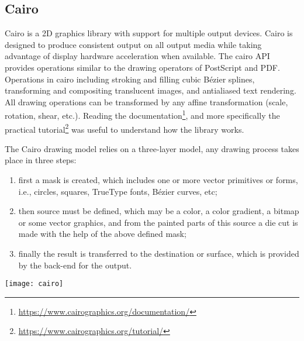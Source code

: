 \subsection{Cairo}

Cairo is a 2D graphics library with support for multiple output devices. Cairo
is designed to produce consistent output on all output media while taking
advantage of display hardware acceleration when available. The cairo API
provides operations similar to the drawing operators of PostScript and PDF.
Operations in cairo including stroking and filling cubic Bézier splines,
transforming and compositing translucent images, and antialiased text rendering.
All drawing operations can be transformed by any affine transformation (scale,
rotation, shear, etc.). Reading the
documentation\footnote{\url{https://www.cairographics.org/documentation/}}, and
more specifically the practical
tutorial\footnote{\url{https://www.cairographics.org/tutorial/}} was useful to
understand how the library works.



The Cairo drawing model relies on a three-layer model, any drawing process takes
place in three steps:

\begin{minipage}{.5\textwidth}
	\begin{enumerate}
		\item first a mask is created, which includes one or more vector
		      primitives or forms, i.e., circles, squares, TrueType fonts, Bézier
		      curves, etc;

		\item then source must be defined, which may be a color, a color
		      gradient, a bitmap or some vector graphics, and from the painted
		      parts of this source a die cut is made with the help of the above
		      defined mask;

		\item finally the result is transferred to the destination or surface,
		      which is provided by the back-end for the output.
	\end{enumerate}
\end{minipage}
\begin{minipage}{.49\textwidth}
	\centering
	\texttt{[image: cairo]}
	\label{fig:cairo}
\end{minipage}
